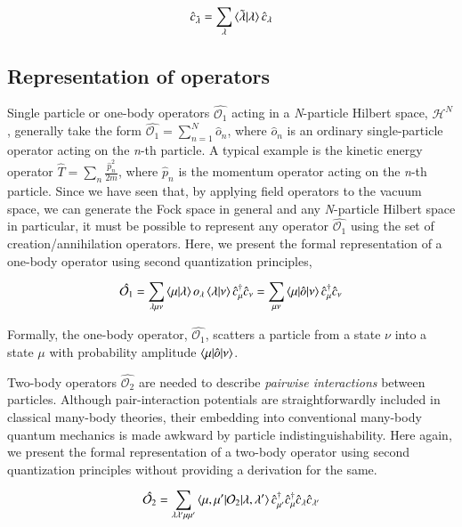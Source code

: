 \documentclass{resonance}
\begin{document}
\begin{equation}
    \hat{c}_{\Tilde{\lambda}} = \sum_{\lambda}\braket{\Tilde{\lambda}|\lambda} \hat{c}_{\lambda} 
\end{equation}

\subsection{Representation of operators}
Single particle or one-body operators $\hat{\mathcal{O}_{1}}$ acting in a \textit{N}-particle Hilbert space, $\mathcal{H}^{N}$, generally take the form $\hat{\mathcal{O}_{1}} = \sum_{n = 1}^{N}\hat{o}_{n}$, where $\hat{o}_{n}$ is an ordinary single-particle operator acting on the \textit{n}-th particle. A typical example is the kinetic energy operator $\hat{T} = \sum_{n}\frac{\hat{p}_{n}^{2}}{2m}$, where $\hat{p}_{n}$ is the momentum operator acting on the \textit{n}-th particle. Since we have seen that, by applying field operators to the vacuum space, we can generate the Fock space in general and any \textit{N}-particle Hilbert space in particular, it must be possible to represent any operator $\hat{\mathcal{O}_{1}}$ using the set of creation/annihilation operators. Here, we present the formal representation of a one-body operator using second quantization principles,

\begin{equation}
    \hat{\mathcal{O}_{1}} = \sum_{\lambda \mu \nu}\braket{\mu | \lambda}o_{\lambda}\braket{\lambda | \nu}\hat{c}^{\dagger}_{\mu} \hat{c}_{\nu} = \sum_{\mu \nu}\braket{\mu|\hat{o}|\nu}\hat{c}^{\dagger}_{\mu} \hat{c}_{\nu}
\end{equation}

Formally, the one-body operator, $\hat{\mathcal{O}_{1}}$, scatters a particle from a state $\nu$ into a state $\mu$ with probability amplitude $\braket{\mu|\hat{o}|\nu}$. \par
Two-body operators $\hat{\mathcal{O}_{2}}$ are needed to describe \textit{pairwise interactions} between particles. Although pair-interaction potentials are
straightforwardly included in classical many-body theories, their embedding into conventional many-body quantum mechanics is made awkward by particle indistinguishability. Here again, we present the formal representation of a two-body operator using second quantization principles without providing a derivation for the same.

\begin{equation}
    \hat{\mathcal{O}_{2}} = \sum_{\lambda \lambda^{\prime} \mu \mu^{\prime}} \braket{\mu, \mu^{\prime}|\mathcal{O}_{2}|\lambda, \lambda^{\prime}} \hat{c}_{\mu^{\prime}}^{\dagger} \hat{c}_{\mu}^{\dagger} \hat{c}_{\lambda} \hat{c}_{\lambda^{\prime}}
\end{equation}
\end{document}
